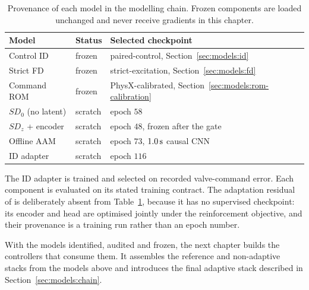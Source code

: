 \begin{table}[H]
  \centering
  \caption{Provenance of each model in the modelling chain. Frozen components
  are loaded unchanged and never receive gradients in this chapter.}
  \label{tab:models:frozen}
  \small
  \begin{tabular}{lll}
    \toprule
    Model & Status & Selected checkpoint \\
    \midrule
    Control ID            & frozen  & paired-control, Section~\ref{sec:models:id} \\
    Strict FD             & frozen  & strict-excitation, Section~\ref{sec:models:fd} \\
    Command ROM           & frozen  & PhysX-calibrated, Section~\ref{sec:models:rom-calibration} \\
    $SD_0$ (no latent)    & scratch & epoch $58$ \\
    $SD_z$ + encoder      & scratch & epoch $48$, frozen after the gate \\
    Offline AAM           & scratch & epoch $73$, $\unit[1.0]{s}$ causal CNN \\
    ID adapter            & scratch & epoch $116$ \\
    \bottomrule
  \end{tabular}
\end{table}

The ID adapter is trained and selected on recorded valve-command error. Each
component is evaluated on its stated training contract. The adaptation residual
of \ppoAAMFD{} is deliberately absent from Table~\ref{tab:models:frozen},
because it has no supervised checkpoint: its encoder and head are optimised
jointly under the reinforcement objective, and their provenance is a training
run rather than an epoch number.

With the models identified, audited and frozen, the next chapter builds the
controllers that consume them. It assembles the reference and non-adaptive
stacks from the models above and introduces the final adaptive stack described
in Section~\ref{sec:models:chain}.
